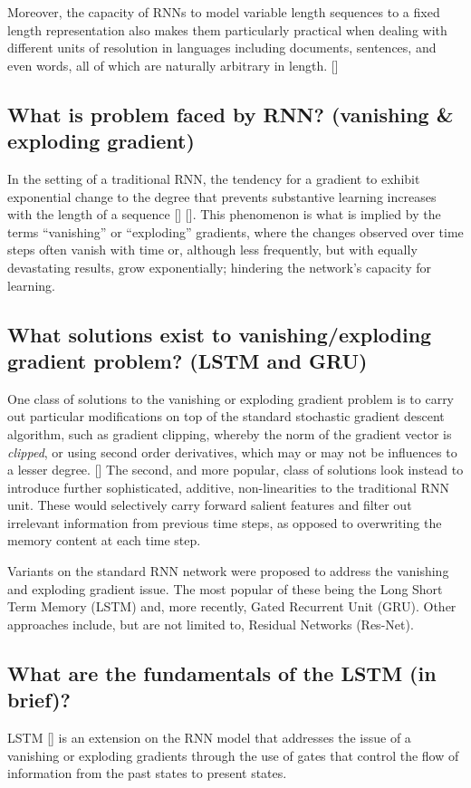 \documentclass[12pt, a4paper]{report}
\theoremstyle{definition}
\theoremstyle{definition}%
\theoremstyle{definition}%
\theoremstyle{definition}%
\theoremstyle{definition}%
\theoremstyle{definition}%
\renewcommand{\cite}[1]{[\citealp{#1}]}
\begin{document}
Moreover, the capacity of RNNs to model variable length sequences to a fixed length representation also makes them particularly practical when dealing with different units of resolution in languages including documents, sentences, and even words, all of which are naturally arbitrary in length. \cite{tang} 

\subsection{What is problem faced by RNN? (vanishing \& exploding gradient)}
In the setting of a traditional RNN, the tendency for a gradient to exhibit exponential change to the degree that prevents substantive learning increases with the length of a sequence \cite{bengio1994} \cite{hochreiter1997}. This phenomenon is what is implied by the terms \enquote{vanishing} or \enquote{exploding} gradients, where the changes observed over time steps often vanish with time or, although less frequently, but with equally devastating results, grow exponentially; hindering the network's capacity for learning.

\subsection{What solutions exist to  vanishing/exploding gradient problem? (LSTM and GRU)}
One class of solutions to the vanishing or exploding gradient problem is to carry out particular modifications on top of the standard stochastic gradient descent algorithm, such as gradient clipping, whereby the norm of the gradient vector is \textit{clipped}, or using second order derivatives, which may or may not be influences to a lesser degree. \cite{chung2014}
The second, and more popular, class of solutions look instead to introduce further sophisticated, additive, non-linearities to the traditional RNN unit. These would selectively carry forward salient features and filter out irrelevant information from previous time steps, as opposed to overwriting the memory content at each time step.  

Variants on the standard RNN network were proposed to address the vanishing and exploding gradient issue. The most popular of these being the Long Short Term Memory (LSTM) and, more recently, Gated Recurrent Unit (GRU). Other approaches include, but are not limited to, Residual Networks (Res-Net).

\subsection{What are the fundamentals of the LSTM (in brief)?}
LSTM \cite{hochreiter1997} is an extension on the RNN model that addresses the issue of a vanishing or exploding gradients through the use of gates that control the flow of information from the past states to present states.
\end{document}
